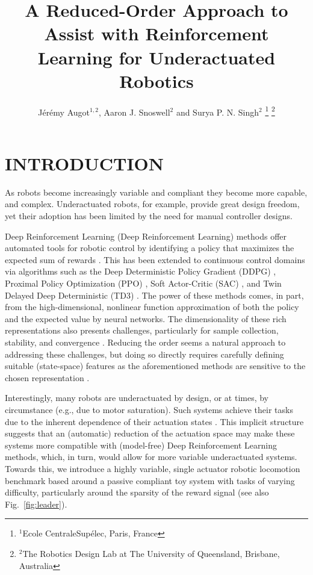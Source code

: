 \documentclass[letterpaper, 10 pt, conference]{ieeeconf}
\title{
    \LARGE \bf%
    A Reduced-Order Approach to Assist with Reinforcement Learning for Underactuated Robotics
}
\author{
    J\'er\'emy Augot$^{1,2}$, Aaron J. Snoswell$^{2}$ and Surya P. N. Singh$^{2}$
    \thanks{
        $^{1}$Ecole CentraleSup\'elec, Paris, France
    }%
    \thanks{
        $^{2}$The Robotics Design Lab at The University of Queensland, Brisbane, Australia
    }%
}
\begin{document}
\maketitle
\thispagestyle{empty}
\pagestyle{empty}

\begin{abstract}

\lipsum[1]

\end{abstract}

\section{INTRODUCTION}

As robots become increasingly variable and compliant they become more capable, and complex.
Underactuated robots, for example, provide great design freedom, yet their adoption has been limited by the need for manual controller designs.

Deep Reinforcement Learning (Deep Reinforcement Learning) methods offer automated tools for robotic control by identifying a policy that maximizes the expected sum of rewards \cite{henderson2018deep}.
This has been extended to continuous control domains via algorithms such as the Deep Deterministic Policy Gradient (DDPG) \cite{DDPG}, Proximal Policy Optimization (PPO) \cite{PPO}, Soft Actor-Critic (SAC) \cite{SAC}, and Twin Delayed Deep Deterministic (TD3) \cite{TD3}.
The power of these methods comes, in part, from the high-dimensional, nonlinear function approximation of both the policy and the expected value by neural networks.
The dimensionality of these rich representations also presents challenges, particularly for sample collection, stability, and convergence \cite{Islam2017}.
Reducing the order seems a natural approach to addressing these challenges, but doing so directly requires carefully defining suitable (state-space) features as the aforementioned methods are sensitive to the chosen representation \cite{bhatnagar2009convergent}.  

Interestingly, many robots are underactuated by design, or at times, by circumstance (e.g., due to motor saturation).
Such systems achieve their tasks due to the inherent dependence of their actuation states \cite{spong1998underactuated}.
This implicit structure suggests that an (automatic) reduction of the actuation space may make these systems more compatible with (model-free) Deep Reinforcement Learning methods, which, in turn, would allow for more variable underactuated systems.
Towards this, we introduce a highly variable, single actuator robotic locomotion benchmark based around a passive compliant toy system with tasks of varying difficulty, particularly around the sparsity of the reward signal (see also Fig.~\ref{fig:leader}).
\end{document}
